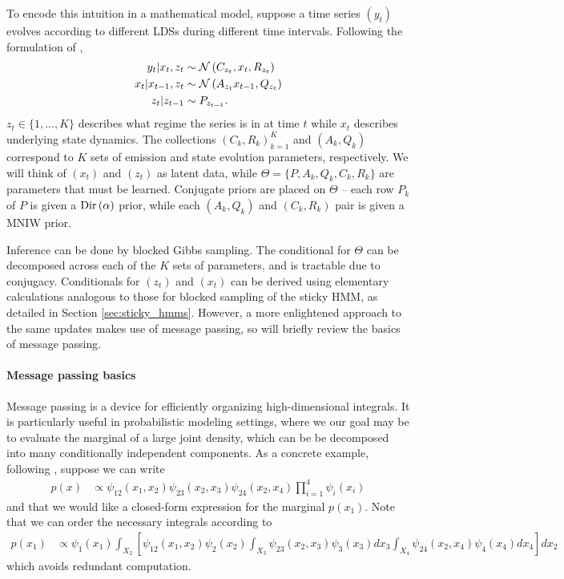 To encode this intuition in a mathematical model, suppose a time series
$\left(y_{t}\right)$ evolves according to different LDSs during different time
intervals. Following the formulation of \citep{linderman2016recurrent},
\begin{align*}
  y_{t} \vert  x_t, z_t &\sim \mathcal{N}\left(C_{z_t}, x_t, R_{z_t}\right) \\
  x_{t} \vert x_{t - 1}, z_{t} &\sim \mathcal{N}\left(A_{z_t}x_{t - 1}, Q_{z_t}\right) \\
  z_t \vert z_{t - 1} &\sim P_{z_{t - 1}}.
\end{align*}
$z_t \in \{1, \dots, K\}$ describes what regime the series is in at time $t$
while $x_t$ describes underlying state dynamics. The collections $\left(C_k,
R_k\right)_{k = 1}^{K}$ and $\left(A_k, Q_k\right)$ correspond to $K$ sets of
emission and state evolution parameters, respectively. We will think of
$\left(x_t\right)$ and $\left(z_t\right)$ as latent data, while $\Theta = \{P,
A_k, Q_k, C_k, R_k\}$ are parameters that must be learned. Conjugate priors are
placed on $\Theta$ -- each row $P_k$ of $P$ is given a $\textnormal{Dir}\left(\alpha\right)$
prior, while each $\left(A_k, Q_k\right)$ and $\left(C_k, R_k\right)$ pair is
given a MNIW prior.

Inference can be done by blocked Gibbs sampling. The conditional for $\Theta$
can be decomposed across each of the $K$ sets of parameters, and is tractable
due to conjugacy. Conditionals for $\left(z_t\right)$ and $\left(x_t\right)$ can
be derived using elementary calculations analogous to those for blocked sampling
of the sticky HMM, as detailed in Section \ref{sec:sticky_hmms}. However, a more
enlightened approach to the same updates makes use of message passing, so will
briefly review the basics of message passing.

\paragraph{Message passing basics}
\label{paragraph:message_passing}

Message passing is a device for efficiently organizing high-dimensional
integrals. It is particularly useful in probabilistic modeling settings, where
we our goal may be to evaluate the marginal of a large joint density, which can
be be decomposed into many conditionally independent components. As a concrete
example, following \cite{fox2009bayesian}, suppose we can write
\begin{align*}
p\left(x\right) &\propto \psi_{12}\left(x_1, x_2\right)\psi_{23}\left(x_2, x_3\right)\psi_{24}\left(x_2, x_4\right) \prod_{i = 1}^{4}\psi_{i}\left(x_i\right)
\end{align*}
and that we would like a closed-form expression for the marginal
$p\left(x_1\right)$. Note that we can order the necessary integrals according to
\begin{align*}
  p\left(x_1\right) &\propto \psi_1\left(x_1\right)
  \int_{X_2}\left[\psi_{12}\left(x_1, x_2\right)\psi_2\left(x_2\right)
    \int_{X_3} \psi_{23}\left(x_2, x_3\right) \psi_3\left(x_3\right) dx_3
    \int_{X_4} \psi_{24}\left(x_2, x_4\right)\psi_4\left(x_4\right) dx_4
    \right] dx_2
\end{align*}
which avoids redundant computation.

